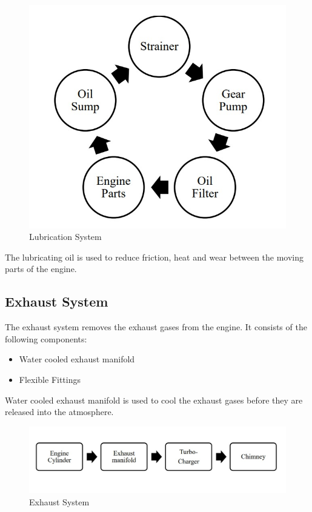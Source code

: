 \documentclass[12pt]{article}
\begin{document}
          \begin{figure}[H]
            \begin{center}
              \includegraphics[width=0.5\linewidth]{img/lubrication.jpeg}
              \caption{Lubrication System}
            \end{center}
          \end{figure}

          The lubricating oil is used to reduce friction, heat and wear between the moving parts of the engine.

          \subsection*{Exhaust System}
          The exhaust system removes the exhaust gases from the engine. It consists of the following components:
          \begin{itemize}
            \item Water cooled exhaust manifold
            \item Flexible Fittings 
          \end{itemize}
          Water cooled exhaust manifold is used to cool the exhaust gases before they are released into the atmosphere.

          \begin{figure}[H]
            \begin{center}
              \includegraphics[width=0.9\linewidth]{img/exhaust_system.jpeg}
              \caption{Exhaust System}
            \end{center}
          \end{figure}
\end{document}
